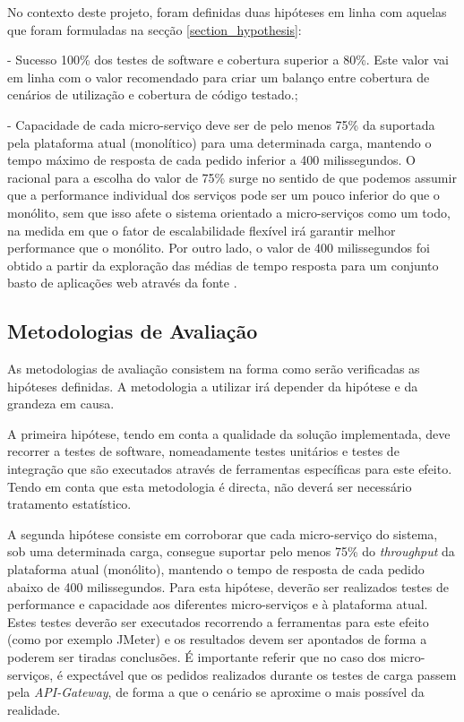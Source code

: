 No contexto deste projeto, foram definidas duas hipóteses em linha com aquelas que foram formuladas na secção \ref{section_hypothesis}:
\begin{description}
    \item - Sucesso 100\% dos testes de software e cobertura superior a 80\%. Este valor vai em linha com o valor recomendado para criar um balanço entre cobertura de cenários de utilização e cobertura de código testado\cite{code_coverage}.;
    \item - Capacidade de cada micro-serviço deve ser de pelo menos 75\% da suportada pela plataforma atual (monolítico) para uma determinada carga, mantendo o tempo máximo de resposta de cada pedido inferior a 400 milissegundos.
    O racional para a escolha do valor de 75\% surge no sentido de que podemos assumir que a performance individual dos serviços pode ser um pouco inferior do que o monólito, sem que isso afete o sistema orientado a micro-serviços como um todo, na medida em que o fator de escalabilidade flexível irá garantir melhor performance que o monólito.
    Por outro lado, o valor de 400 milissegundos foi obtido a partir da exploração das médias de tempo resposta para um conjunto basto de aplicações web através da fonte \cite{average_server_response_time}.
\end{description}

\subsection{Metodologias de Avaliação}
As metodologias de avaliação consistem na forma como serão verificadas as hipóteses definidas. A metodologia a utilizar irá depender da hipótese e da grandeza em causa.

A primeira hipótese, tendo em conta a qualidade da solução implementada, deve recorrer a testes de software, nomeadamente testes unitários e testes de integração que são executados através de ferramentas específicas para este efeito. Tendo em conta que esta metodologia é directa, não deverá ser necessário tratamento estatístico.

A segunda hipótese consiste em corroborar que cada micro-serviço do sistema, sob uma determinada carga, consegue suportar pelo menos 75\% do \emph{throughput} da plataforma atual (monólito), mantendo o tempo de resposta de cada pedido abaixo de 400 milissegundos. Para esta hipótese, deverão ser realizados testes de performance e capacidade aos diferentes micro-serviços e à plataforma atual. Estes testes deverão ser executados recorrendo a ferramentas para este efeito (como por exemplo JMeter) e os resultados devem ser apontados de forma a poderem ser tiradas conclusões. É importante referir que no caso dos micro-serviços, é expectável que os pedidos realizados durante os testes de carga passem pela \emph{API-Gateway}, de forma a que o cenário se aproxime o mais possível da realidade.

